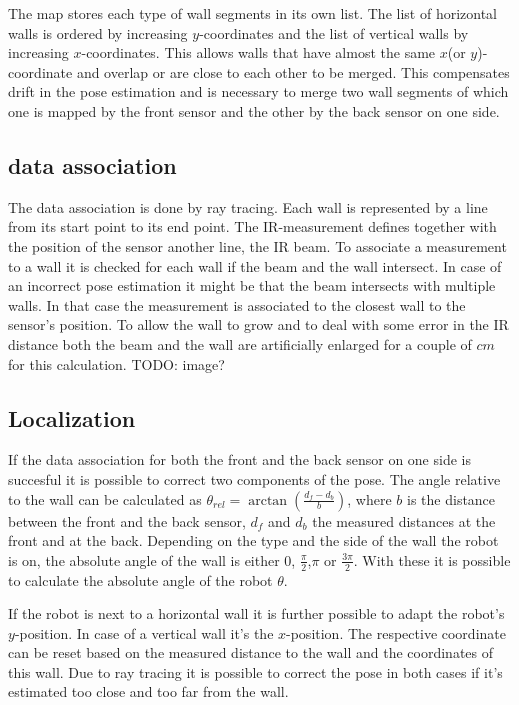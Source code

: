 The map stores each type of wall segments in its own list. The list of horizontal walls is ordered by increasing $y$-coordinates and the list of vertical walls by increasing $x$-coordinates. This allows walls that have almost the same $x$(or $y$)-coordinate and overlap or are close to each other to be merged. This compensates drift in the pose estimation and is necessary to merge two wall segments of which one is mapped by the front sensor and the other by the back sensor on one side. 

\subsection{data association}
\label{dataAssoc}
The data association is done by ray tracing. Each wall is represented by a line from its start point to its end point. The IR-measurement defines together with the position of the sensor another line, the IR beam. To associate a measurement to a wall it is checked for each wall if the beam and the wall intersect. In case of an incorrect pose estimation it might be that the beam intersects with multiple walls. In that case the measurement is associated to the closest wall to the sensor's position. To allow the wall to grow and to deal with some error in the IR distance both the beam and the wall are artificially enlarged for a couple of $cm$ for this calculation. TODO: image?    

\subsection{Localization}
\label{Localization}
If the data association for both the front and the back sensor on one side is succesful it is possible to correct two components of the pose. The angle relative to the wall can be calculated as $\theta_{rel} = \arctan(\frac{d_{f} - d_{b}}{b})$, where $b$ is the distance between the front and the back sensor, $d_f$ and $d_b$ the measured distances at the front and at the back. Depending on the type and the side of the wall the robot is on, the absolute angle of the wall is either $0$, $\frac{\pi}{2}$,$\pi$ or $\frac{3 \pi}{2}$. With these it is possible to calculate the absolute angle of the robot $\theta$.

If the robot is next to a horizontal wall it is further possible to adapt the robot's $y$-position. In case of a vertical wall it's the $x$-position.
The respective coordinate can be reset based on the measured distance to the wall and the coordinates of this wall. Due to ray tracing it is possible to correct the pose in both cases if it's estimated too close and too far from the wall.

